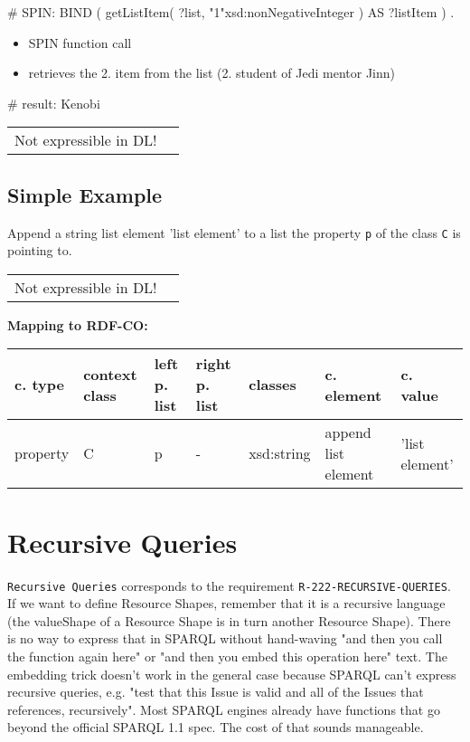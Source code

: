 \documentclass{llncs}
\newcommand{\ms}[1]{\texttt{#1}}
\newenvironment{gcotable}{
  \scriptsize
  \sffamily
  \vspace{0cm}
	\begin{center}
	\textbf{\vspace{0.4cm}Mapping to RDF-CO:} \\
  \begin{tabular}{l|l|l|l|l|l|l}
	\hline
  \textbf{c. type} & \textbf{context class} & \textbf{left p. list} & \textbf{right p. list} & \textbf{classes} & \textbf{c. element} & \textbf{c. value} \\
  \hline

}{
  \hline
  \end{tabular}
	\end{center}
}
\newenvironment{DL}{
  \vspace{0cm}
	\begin{center}
  \begin{tabular}{r l}

}{
  \end{tabular}
	\end{center}
}
\begin{document}
\begin{ex}
# SPIN:
BIND ( getListItem( ?list, "1"xsd:nonNegativeInteger ) AS ?listItem ) .
\end{ex}

\begin{itemize}
  \item SPIN function call
	\item retrieves the 2. item from the list (2. student of Jedi mentor Jinn)
\end{itemize}

\begin{ex}
# result:
Kenobi
\end{ex}

\begin{DL}
Not expressible in DL!
\end{DL}

\subsection{Simple Example}

Append a string list element 'list element' to a list the property \ms{p} of the class \ms{C} is pointing to.

\begin{DL}
Not expressible in DL!
\end{DL}

\begin{gcotable}
property & C & p & - & xsd:string & append list element & 'list element' \\
\end{gcotable}

\section{Recursive Queries}

\ms{Recursive Queries} corresponds to the requirement
\ms{R-222-RECURSIVE-QUERIES}.
If we want to define Resource Shapes, remember that it is a recursive
language (the valueShape of a Resource Shape is in turn another
Resource Shape). There is no way to express that in SPARQL without
hand-waving "and then you call the function again here" or "and then
you embed this operation here" text.  The embedding trick doesn't work
in the general case because SPARQL can't express recursive queries,
e.g. "test that this Issue is valid and all of the Issues that
references, recursively".
Most SPARQL engines already have
functions that go beyond the official SPARQL 1.1 spec. The cost of that
sounds manageable.
\end{document}
